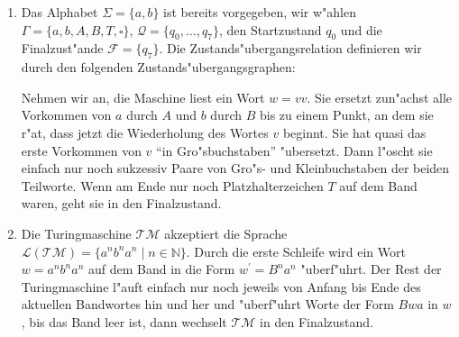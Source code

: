 \documentclass[10pt,oneside,onecolumn,a4paper,german,titlepage]{article}
\begin{document}
\begin{enumerate}
\item Das Alphabet $\Sigma = \{a,b\}$ ist bereits vorgegeben, wir w"ahlen
$\Gamma = \{a,b,A,B,T,\square\}$, $\mathcal{Q} = \{q_0,\dots,q_7 \}$,
den Startzustand $q_0$ und die Finalzust"ande $\mathcal{F} = \{q_7\}$.
Die Zustands"ubergangsrelation definieren wir durch den folgenden
Zustands"ubergangsgraphen:
\begin{center}
\end{center}
Nehmen wir an, die Maschine liest ein Wort $w = vv$. Sie ersetzt zun"achst alle
Vorkommen von $a$ durch $A$ und $b$ durch $B$ bis zu einem Punkt, an dem sie r"at,
dass jetzt die Wiederholung des Wortes $v$ beginnt. Sie hat quasi das erste
Vorkommen von $v$ ``in Gro"sbuchstaben'' "ubersetzt. Dann l"oscht sie einfach nur
noch sukzessiv Paare von Gro"s- und Kleinbuchstaben der beiden Teilworte. Wenn am
Ende nur noch Platzhalterzeichen $T$ auf dem Band waren, geht sie in den
Finalzustand.
\item Die Turingmaschine $\mathcal{TM}$ akzeptiert die Sprache $\mathcal{L}
(\mathcal{TM}) = \{a^nb^na^n \; | \; n \in \mathbb{N}\}$. Durch die erste Schleife
wird ein Wort $w = a^nb^na^n$ auf dem Band in die Form $w^\prime = B^na^n$
"uberf"uhrt. Der Rest der Turingmaschine l"auft einfach nur noch jeweils von
Anfang bis Ende des aktuellen Bandwortes hin und her und "uberf"uhrt Worte der
Form $Bwa$ in $w$, bis das Band leer ist, dann wechselt $\mathcal{TM}$ in den
Finalzustand.
\end{enumerate}
\end{document}
